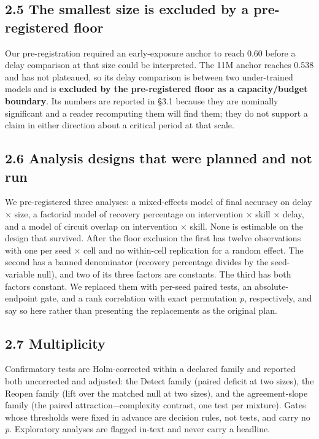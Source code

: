 \documentclass[11pt]{article}
\begin{document}
\subsection{2.5 The smallest size is excluded by a pre-registered floor}\label{the-smallest-size-is-excluded-by-a-pre-registered-floor}

Our pre-registration required an early-exposure anchor to reach 0.60 before a delay
comparison at that size could be interpreted. The 11M anchor reaches 0.538 and has not
plateaued, so its delay comparison is between two under-trained models and is \textbf{excluded by
the pre-registered floor as a capacity/budget boundary}. Its numbers are reported in §3.1
because they are nominally significant and a reader recomputing them will find them; they do
not support a claim in either direction about a critical period at that scale.

\subsection{2.6 Analysis designs that were planned and not run}\label{analysis-designs-that-were-planned-and-not-run}

We pre-registered three analyses: a mixed-effects model of final accuracy on delay × size, a
factorial model of recovery percentage on intervention × skill × delay, and a model of
circuit overlap on intervention × skill. None is estimable on the design that survived. After
the floor exclusion the first has twelve observations with one per seed × cell and no
within-cell replication for a random effect. The second has a banned denominator (recovery
percentage divides by the seed-variable null), and two of its three factors are constants.
The third has both factors constant. We replaced them with per-seed paired tests, an
absolute-endpoint gate, and a rank correlation with exact permutation \emph{p}, respectively, and
say so here rather than presenting the replacements as the original plan.

\subsection{2.7 Multiplicity}\label{multiplicity}

Confirmatory tests are Holm-corrected within a declared family and reported both uncorrected
and adjusted: the Detect family (paired deficit at two sizes), the Reopen family (lift over
the matched null at two sizes), and the agreement-slope family (the paired
attraction−complexity contrast, one test per mixture). Gates whose thresholds were
fixed in advance are decision rules, not tests, and carry no \emph{p}. Exploratory analyses are
flagged in-text and never carry a headline.
\end{document}
